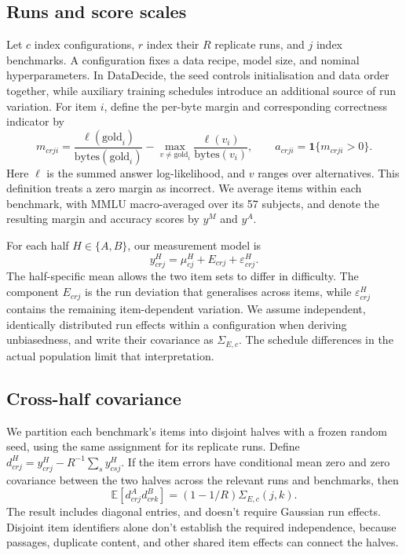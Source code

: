 \documentclass{article}
\begin{document}
\subsection{Runs and score scales}
Let $c$ index configurations, $r$ index their $R$ replicate runs, and $j$ index benchmarks. A configuration fixes a data recipe, model size, and nominal hyperparameters. In DataDecide, the seed controls initialisation and data order together, while auxiliary training schedules introduce an additional source of run variation. For item $i$, define the per-byte margin and corresponding correctness indicator by
\begin{equation}
m_{crji}=\frac{\ell(\mathrm{gold}_i)}{\mathrm{bytes}(\mathrm{gold}_i)}-
\max_{v\ne\mathrm{gold}_i}\frac{\ell(v_i)}{\mathrm{bytes}(v_i)},
\qquad a_{crji}=\mathbf{1}\{m_{crji}>0\}.
\label{eq:scores}
\end{equation}
Here $\ell$ is the summed answer log-likelihood, and $v$ ranges over alternatives. This definition treats a zero margin as incorrect. We average items within each benchmark, with MMLU macro-averaged over its 57 subjects, and denote the resulting margin and accuracy scores by $y^M$ and $y^A$.

For each half $H\in\{A,B\}$, our measurement model is
\begin{equation}
y^H_{crj}=\mu^H_{cj}+E_{crj}+\varepsilon^H_{crj}.
\end{equation}
The half-specific mean allows the two item sets to differ in difficulty. The component $E_{crj}$ is the run deviation that generalises across items, while $\varepsilon^H_{crj}$ contains the remaining item-dependent variation. We assume independent, identically distributed run effects within a configuration when deriving unbiasedness, and write their covariance as $\Sigma_{E,c}$. The schedule differences in the actual population limit that interpretation.

\subsection{Cross-half covariance}
We partition each benchmark's items into disjoint halves with a frozen random seed, using the same assignment for its replicate runs. Define $d^H_{crj}=y^H_{crj}-R^{-1}\sum_s y^H_{csj}$. If the item errors have conditional mean zero and zero covariance between the two halves across the relevant runs and benchmarks, then
\begin{equation}
\mathbb{E}[d^A_{crj}d^B_{crk}]=(1-1/R)\Sigma_{E,c}(j,k).
\label{eq:identity}
\end{equation}
The result includes diagonal entries, and doesn't require Gaussian run effects. Disjoint item identifiers alone don't establish the required independence, because passages, duplicate content, and other shared item effects can connect the halves.
\end{document}
